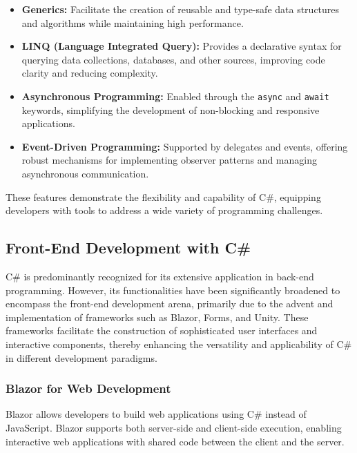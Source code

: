 \begin{itemize} 
\item \textbf{Generics:} Facilitate the creation of reusable and type-safe data structures and algorithms while maintaining high performance. 
\item \textbf{LINQ (Language Integrated Query):} Provides a declarative syntax for querying data collections, databases, and other sources, improving code clarity and reducing complexity. 
\item \textbf{Asynchronous Programming:} Enabled through the \texttt{async} and \texttt{await} keywords, simplifying the development of non-blocking and responsive applications. 
\item \textbf{Event-Driven Programming:} Supported by delegates and events, offering robust mechanisms for implementing observer patterns and managing asynchronous communication. \end{itemize}

These features demonstrate the flexibility and capability of C\#, equipping developers with tools to address a wide variety of programming challenges.

\subsection{Front-End Development with C\#}

C\# is predominantly recognized for its extensive application in back-end programming. However, its functionalities have been significantly broadened to encompass the front-end development arena, primarily due to the advent and implementation of frameworks such as Blazor, Forms, and Unity. These frameworks facilitate the construction of sophisticated user interfaces and interactive components, thereby enhancing the versatility and applicability of C\# in different development paradigms.

\subsubsection{Blazor for Web Development}  
Blazor allows developers to build web applications using C\# instead of JavaScript. Blazor supports both server-side and client-side execution, enabling interactive web applications with shared code between the client and the server.
